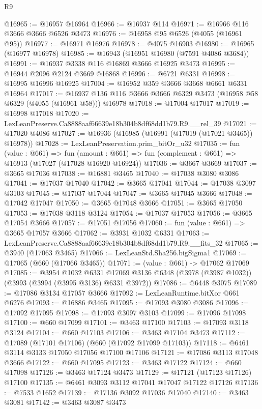 \begin{lexlean}{R9}
\begin{coremodule}
@16965 := @16957 @16964
@16966 := @16937 @114
@16971 := @16966 @116 @3666 @3666 @6526 @3473
@16976 := @16958 @95 @6526 (@4055 (@16961 @95))
@16977 := @16971 @16976
@16978 := @4075 @16903
@16980 := @16965 (@16977 @16978)
@16985 := @16943 (@16951 @16980 (@7591 @4086 @3684))
@16991 := @16937 @3338 @116 @16869 @3666 @16925 @3473
@16995 := @16944 @2096 @2124 @3669 @16868
@16996 := @6721 @6331
@16998 := @16995 @16996 @16925
@17004 := @16952 @359 @3666 @3668 @6661 @6331 @16964
@17017 := @16937 @136 @116 @3666 @3666 @6329 @3473 (@16958 @58 @6329 (@4055 (@16961 @58))) @16978
@17018 := @17004 @17017
@17019 := @16998 @17018
@17020 := LexLeanPreserve.Ca8888aaf66639e18b304b8df68dd1b79.R9.__rel_39
@17021 := @17020 @4086
@17027 := @16936 (@16985 (@16991 (@17019 (@17021 @3465)) @16978))
@17028 := LexLeanPreservation.prim_bitOr_u32
@17035 := fun (value : @661) =>
  fun (amount : @661) => fun (complement : @661) => @16913 (@17027 (@17028 @16920 @16924))
@17036 := @3667 @3669
@17037 := @3665 @17036
@17038 := @16881 @3465
@17040 := @17038 @3080 @3086
@17041 := @17037 @17040
@17042 := @3665 @17041
@17044 := @17038 @3097 @3103
@17045 := @17037 @17044
@17047 := @3665 @17045 @3666
@17048 := @17042 @17047
@17050 := @3665 @17048 @3666
@17051 := @3665 @17050
@17053 := @17038 @3118 @3124
@17054 := @17037 @17053
@17056 := @3665 @17054 @3666
@17057 := @17051 @17056
@17060 := fun (value : @661) => @3665 @17057 @3666
@17062 := @3931 @1032 @6331
@17063 := LexLeanPreserve.Ca8888aaf66639e18b304b8df68dd1b79.R9.__fits_32
@17065 := @3940 (@17063 @3465)
@17066 := LexLeanStd.Sha256.bigSigma1
@17069 := @17065 (@660 (@17066 @3465))
@17071 := (value : @661) -> @17062 @17069
@17085 := @3954
    @1032
    @6331
    @17069
    @3136
    @6348
    (@3978 (@3987 @1032))
    (@3993 (@3994 (@3995 @3136) @6331 @3972))
@17086 := @6448 @3075
@17089 := @17086 @3134 @17057 @3666
@17092 := LexLeanRuntime.bitXor @661 @6276
@17093 := @16886 @3465
@17095 := @17093 @3080 @3086
@17096 := @17092 @17095
@17098 := @17093 @3097 @3103
@17099 := @17096 @17098
@17100 := @660 @17099
@17101 := @3463 @17100
@17103 := @17093 @3118 @3124
@17104 := @660 @17103
@17106 := @3463 @17104 @3473
@17112 := @17089 (@17101 @17106) (@660 (@17092 @17099 @17103))
@17118 := @6461 @3114 @3133 @17050 @17056 @17100 @17106
@17121 := @17086 @3113 @17048 @3666
@17122 := @660 @17095
@17123 := @3463 @17122
@17124 := @660 @17098
@17126 := @3463 @17124 @3473
@17129 := @17121 (@17123 @17126) @17100
@17135 := @6461 @3093 @3112 @17041 @17047 @17122 @17126
@17136 := @7533 @1652
@17139 := @17136 @3092 @17036 @17040
@17140 := @3463 @3081
@17142 := @3463 @3087 @3473

\end{coremodule}
\end{lexlean}
